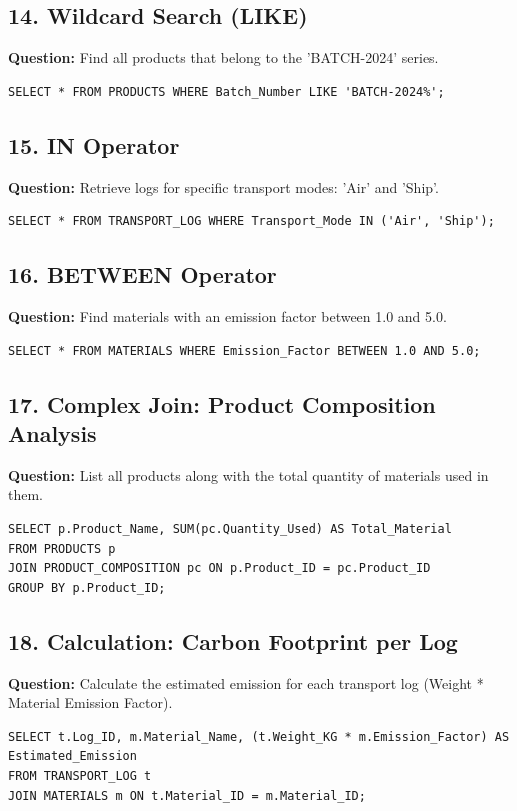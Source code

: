 \documentclass[12pt,a4paper]{article}
\begin{document}
\subsection*{14. Wildcard Search (LIKE)}
\textbf{Question:} Find all products that belong to the 'BATCH-2024' series.
\begin{lstlisting}
SELECT * FROM PRODUCTS WHERE Batch_Number LIKE 'BATCH-2024%';
\end{lstlisting}

\subsection*{15. IN Operator}
\textbf{Question:} Retrieve logs for specific transport modes: 'Air' and 'Ship'.
\begin{lstlisting}
SELECT * FROM TRANSPORT_LOG WHERE Transport_Mode IN ('Air', 'Ship');
\end{lstlisting}

\subsection*{16. BETWEEN Operator}
\textbf{Question:} Find materials with an emission factor between 1.0 and 5.0.
\begin{lstlisting}
SELECT * FROM MATERIALS WHERE Emission_Factor BETWEEN 1.0 AND 5.0;
\end{lstlisting}

\subsection*{17. Complex Join: Product Composition Analysis}
\textbf{Question:} List all products along with the total quantity of materials used in them.
\begin{lstlisting}
SELECT p.Product_Name, SUM(pc.Quantity_Used) AS Total_Material
FROM PRODUCTS p
JOIN PRODUCT_COMPOSITION pc ON p.Product_ID = pc.Product_ID
GROUP BY p.Product_ID;
\end{lstlisting}

\subsection*{18. Calculation: Carbon Footprint per Log}
\textbf{Question:} Calculate the estimated emission for each transport log (Weight * Material Emission Factor).
\begin{lstlisting}
SELECT t.Log_ID, m.Material_Name, (t.Weight_KG * m.Emission_Factor) AS Estimated_Emission
FROM TRANSPORT_LOG t
JOIN MATERIALS m ON t.Material_ID = m.Material_ID;
\end{lstlisting}
\end{document}
